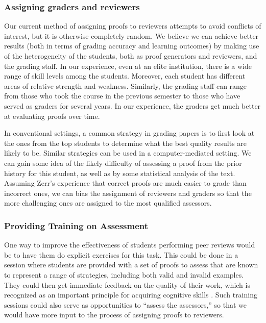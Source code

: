 \documentclass[12pt]{article}
\begin{document}
\subsubsection{Assigning graders and reviewers}

Our current method of assigning proofs to reviewers attempts to avoid
conflicts of interest, but it is otherwise completely random.  We
believe we can achieve better results (both in terms of grading accuracy and learning outcomes) by making use of the
heterogeneity of the students, both as proof generators and reviewers,
and the grading staff.  In our experience, even at an elite
institution, there is a wide range of skill levels among the students.
Moreover, each student has different areas of relative strength and
weakness.  Similarly, the grading staff can range from those who took
the course in the previous semester to those who have served as
graders for several years.  In our experience, the graders get much
better at evaluating proofs over time.

In conventional settings, a common strategy in grading papers is to
first look at the ones from the top students to determine what the
best quality results are likely to be.  Similar strategies can be used
in a computer-mediated setting.  We can gain some idea of the likely
difficulty of assessing a proof from the prior history for this
student, as well as by some statistical analysis of the text.
Assuming Zerr's experience that correct proofs are much easier to
grade than incorrect ones, we can bias the assignment of reviewers and
graders so that the more challenging ones are assigned to the most
qualified assessors.

\subsubsection{Providing Training on Assessment}

One way to improve the effectiveness of students performing peer
reviews would be to have them do explicit exercises for this task.
This could be done in a session where students are provided with a set
of proofs to assess that are known to represent a range of strategies,
including both valid and invalid examples.  They could then get
immediate feedback on the quality of their work, which is recognized
as an important principle for acquiring cognitive skills
\citep{anderson-jls95}.  Such training sessions could also serve as
opportunities to ``assess the assessors,'' so that we would have more
input to the process of assigning proofs to reviewers.
\end{document}
